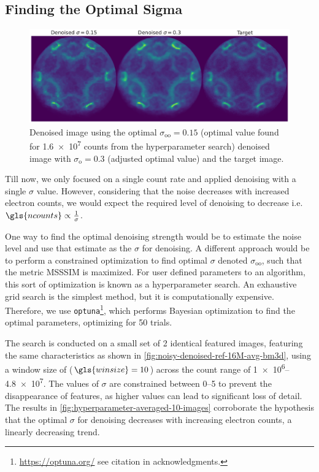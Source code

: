 \subsection{Finding the Optimal Sigma}
\begin{figure}
    \centering
    \includegraphics[width=1\linewidth]{images/denoised_optimal_sigma.pdf}
    \caption{Denoised image using the optimal $\sigma_{\text{oo}}=0.15$ (optimal value found for \num{1.6e7} counts from the hyperparameter search) denoised image with $\sigma_{\text{o}}=0.3$ (adjusted optimal value) and the target image.}
    \label{fig:denoised-optimal-sigma}
\end{figure}
Till now, we only focused on a single count rate and applied denoising with a single $\sigma$ value. However, considering that the noise decreases with increased electron counts, we would expect the required level of denoising to decrease i.e. $\gls{ncounts}\propto\frac{1}{\sigma}$.

One way to find the optimal denoising strength would be to estimate the noise level and use that estimate as the $\sigma$ for denoising. A different approach would be to perform a constrained optimization to find optimal $\sigma$ denoted $\sigma_{\text{oo}}$, such that the metric \gls{MSSSIM} is maximized. For user defined parameters to an algorithm, this sort of optimization is known as a hyperparameter search. An exhaustive grid search is the simplest method, but it is computationally expensive. Therefore, we use \texttt{optuna}\footnote{\href{https://optuna.org/}{https://optuna.org/} see citation in acknowledgments.}, which performs Bayesian optimization to find the optimal parameters, optimizing for \num{50} trials.

The search is conducted on a small set of \num{2} identical featured images, featuring the same characteristics as shown in \cref{fig:noisy-denoised-ref-16M-avg-bm3d}, using a window size of ($\gls{winsize} = \num{10}$) across the count range of \numrange{1e6}{4.8e7}. The values of $\sigma$ are constrained between \numrange{0}{5} to prevent the disappearance of features, as higher values can lead to significant loss of detail. The results in \cref{fig:hyperparameter-averaged-10-images} corroborate the hypothesis that the optimal $\sigma$ for denoising decreases with increasing electron counts, a linearly decreasing trend.

